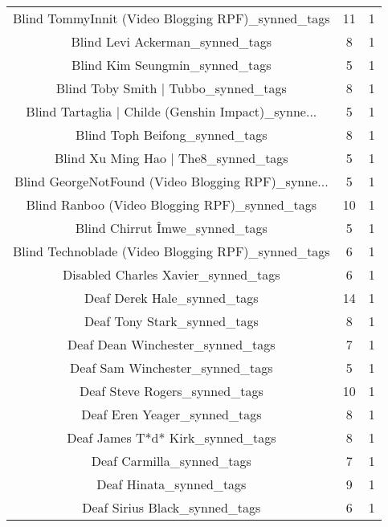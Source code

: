 \begin{table}[h!]
{\begin{tabular}{|c|c|c|}
 Blind TommyInnit (Video Blogging RPF)\_synned\_tags &          11 &          1 \\
                   Blind Levi Ackerman\_synned\_tags &           8 &          1 \\
                    Blind Kim Seungmin\_synned\_tags &           5 &          1 \\
              Blind Toby Smith | Tubbo\_synned\_tags &           8 &          1 \\
Blind Tartaglia | Childe (Genshin Impact)\_synne... &           5 &          1 \\
                    Blind Toph Beifong\_synned\_tags &           8 &          1 \\
              Blind Xu Ming Hao | The8\_synned\_tags &           5 &          1 \\
Blind GeorgeNotFound (Video Blogging RPF)\_synne... &           5 &          1 \\
     Blind Ranboo (Video Blogging RPF)\_synned\_tags &          10 &          1 \\
                    Blind Chirrut Îmwe\_synned\_tags &           5 &          1 \\
Blind Technoblade (Video Blogging RPF)\_synned\_tags &           6 &          1 \\
               Disabled Charles Xavier\_synned\_tags &           6 &          1 \\
                       Deaf Derek Hale\_synned\_tags &          14 &          1 \\
                       Deaf Tony Stark\_synned\_tags &           8 &          1 \\
                  Deaf Dean Winchester\_synned\_tags &           7 &          1 \\
                   Deaf Sam Winchester\_synned\_tags &           5 &          1 \\
                     Deaf Steve Rogers\_synned\_tags &          10 &          1 \\
                      Deaf Eren Yeager\_synned\_tags &           8 &          1 \\
                  Deaf James T*d* Kirk\_synned\_tags &           8 &          1 \\
                         Deaf Carmilla\_synned\_tags &           7 &          1 \\
                           Deaf Hinata\_synned\_tags &           9 &          1 \\
                     Deaf Sirius Black\_synned\_tags &           6 &          1 \\

\end{tabular}}
\end{table}
